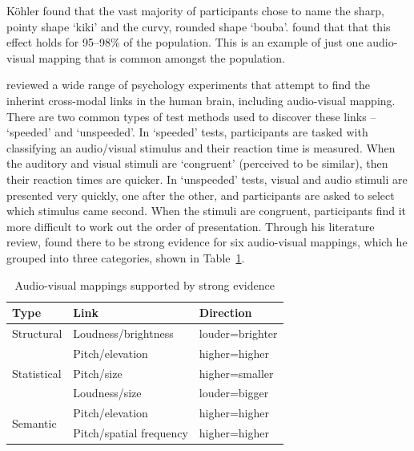 K\"{o}hler found that the vast majority of participants chose to name the sharp, pointy shape `kiki' and the curvy,
rounded shape `bouba'. \citet{Ramachandran2001} found that that this effect holds for 95--98\% of the population. This
is an example of just one audio-visual mapping that is common amongst the population.



\citet{Spence2011} reviewed a wide range of psychology experiments that attempt to find the inherint cross-modal links
in the human brain, including audio-visual mapping.  There are two common types of test methods used to discover these
links -- `speeded' and `unspeeded'.  In `speeded' tests, participants are tasked with classifying an audio/visual
stimulus and their reaction time is measured. When the auditory and visual stimuli are `congruent' (perceived to be
similar), then their reaction times are quicker. In `unspeeded' tests, visual and audio stimuli are presented very
quickly, one after the other, and participants are asked to select which stimulus came second. When the stimuli are
congruent, participants find it more difficult to work out the order of presentation.
Through his literature review, \citet{Spence2011} found there to be strong evidence for six audio-visual mappings,
which he grouped into three categories, shown in Table~\ref{tab:crossmodal}.

\begin{table}
\centering
\begin{tabular}{|l|l|l|}
\hline
\textbf{Type} & \textbf{Link} & \textbf{Direction} \\ \hline
Structural    & Loudness/brightness  & louder=brighter \\ \hline
\multirow{3}{*}{Statistical} & Pitch/elevation & higher=higher \\ \cline{2-3}
              & Pitch/size & higher=smaller \\ \cline{2-3}
              & Loudness/size & louder=bigger \\ \hline
\multirow{2}{*}{Semantic} & Pitch/elevation & higher=higher \\ \cline{2-3}
              & Pitch/spatial frequency & higher=higher \\ \hline
\end{tabular}
\caption{Audio-visual mappings supported by strong evidence \citep{Spence2011}}
\label{tab:crossmodal}
\end{table}

